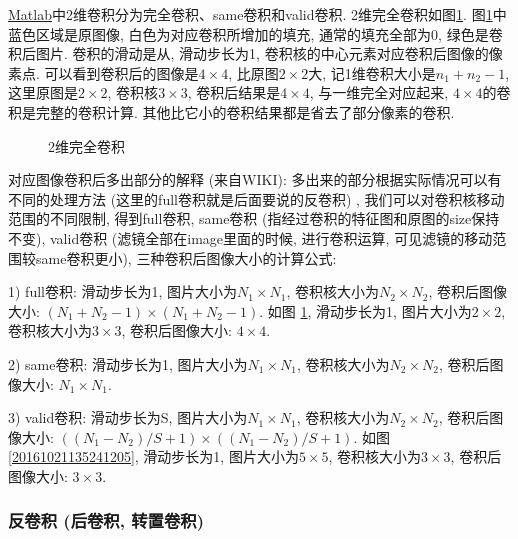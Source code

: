 \href{https://cn.mathworks.com/help/matlab/ref/conv2.html?requestedDomain=www.mathworks.com}{Matlab}中2维卷积分为完全卷积、same卷积和valid卷积.
2维完全卷积如图\ref{CNN20161021141659634}.
图\ref{CNN20161021141659634}中蓝色区域是原图像, 白色为对应卷积所增加的填充, 通常的填充全部为0, 绿色是卷积后图片.
卷积的滑动是从, 滑动步长为1, 卷积核的中心元素对应卷积后图像的像素点.
可以看到卷积后的图像是$4\times 4$, 比原图$2\times 2$大, 记1维卷积大小是$n_1+n_2-1$, 这里原图是$2\times 2$, 卷积核$3\times 3$, 卷积后结果是$4\times 4$, 与一维完全对应起来,
$4\times 4$的卷积是完整的卷积计算. 其他比它小的卷积结果都是省去了部分像素的卷积.
\begin{figure}[H]
\centering
{}
\caption{2维完全卷积}
\label{CNN20161021141659634}
\end{figure}
对应图像卷积后多出部分的解释 (来自WIKI): 多出来的部分根据实际情况可以有不同的处理方法 (这里的full卷积就是后面要说的反卷积) ,
我们可以对卷积核移动范围的不同限制, 得到full卷积, same卷积 (指经过卷积的特征图和原图的size保持不变), valid卷积 (滤镜全部在image里面的时候, 进行卷积运算, 可见滤镜的移动范围较same卷积更小), 三种卷积后图像大小的计算公式:

1) full卷积: 滑动步长为1, 图片大小为$N_1\times N_1$, 卷积核大小为$N_2\times N_2$, 卷积后图像大小: $ (N_1+N_2-1) \times (N_1+N_2-1)$.
如图 \ref{CNN20161021141659634}, 滑动步长为1, 图片大小为$2\times 2$, 卷积核大小为$3\times 3$, 卷积后图像大小: $4\times 4$.

2) same卷积: 滑动步长为1, 图片大小为$N_1\times N_1$, 卷积核大小为$N_2\times N_2$, 卷积后图像大小: $N_1\times N_1$.

3) valid卷积: 滑动步长为S, 图片大小为$N_1\times N_1$, 卷积核大小为$N_2\times N_2$, 卷积后图像大小: $ ( (N_1-N_2)/S+1) \times ( (N_1-N_2)/S+1)$.
如图 \ref{20161021135241205}, 滑动步长为1, 图片大小为$5\times 5$, 卷积核大小为$3\times 3$, 卷积后图像大小: $3\times 3$.

\subsubsection{反卷积 (后卷积, 转置卷积)}

